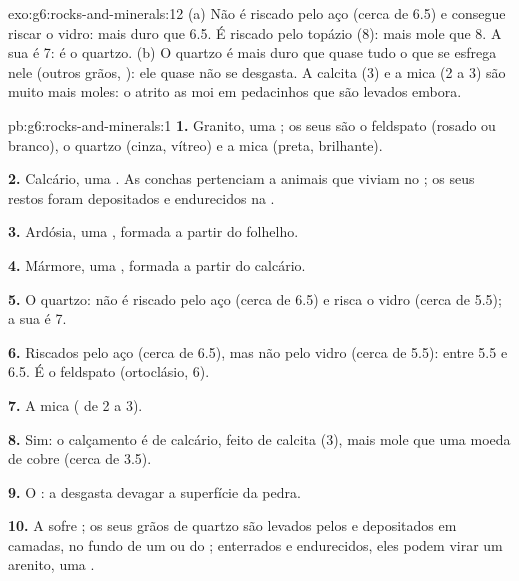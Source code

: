\begin{solution}{exo:g6:rocks-and-minerals:12}
(a) Não é riscado pelo aço (cerca de 6.5) e consegue riscar o vidro: mais
duro que 6.5. É riscado pelo topázio (8): mais mole que 8. A sua  é
7: é o quartzo. (b) O quartzo é mais duro que quase tudo o que se esfrega
nele (outros grãos, ): ele quase não se desgasta. A calcita (3) e a
mica (2 a 3) são muito mais moles: o atrito as moi em pedacinhos que são
levados embora.
\end{solution}

\begin{solution}{pb:g6:rocks-and-minerals:1}
\textbf{1.} Granito, uma ; os seus  são o feldspato
(rosado ou branco), o quartzo (cinza, vítreo) e a mica (preta, brilhante).

\textbf{2.} Calcário, uma . As conchas pertenciam a animais
que viviam no ; os seus restos foram depositados e endurecidos na
.

\textbf{3.} Ardósia, uma , formada a partir do folhelho.

\textbf{4.} Mármore, uma , formada a partir do calcário.

\textbf{5.} O quartzo: não é riscado pelo aço (cerca de 6.5) e risca o
vidro (cerca de 5.5); a sua  é 7.

\textbf{6.} Riscados pelo aço (cerca de 6.5), mas não pelo vidro (cerca de
5.5): entre 5.5 e 6.5. É o feldspato (ortoclásio, 6).

\textbf{7.} A mica ( de 2 a 3).

\textbf{8.} Sim: o calçamento é de calcário, feito de calcita (3), mais
mole que uma moeda de cobre (cerca de 3.5).

\textbf{9.} O : a  desgasta devagar a superfície da
pedra.

\textbf{10.} A  sofre ; os seus grãos de quartzo são
levados pelos  e depositados em camadas, no fundo de um  ou do ;
enterrados e endurecidos, eles podem virar um arenito, uma .


\end{solution}
